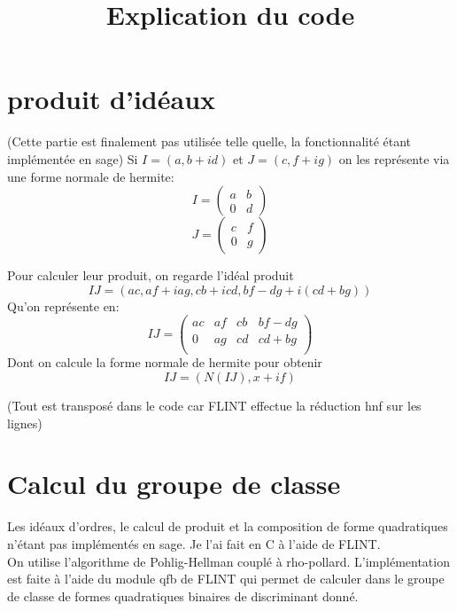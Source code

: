 \documentclass[12pt]{article}
\theoremstyle{plain}
\theoremstyle{definition}
\begin{document}
\title{Explication du code}
\section{produit d'idéaux}
\maketitle
(Cette partie est finalement pas utilisée telle quelle, la fonctionnalité étant implémentée en sage)
Si $I=(a, b+id)$ et $J=(c, f+ig)$ on les représente via une forme normale de hermite:
\[
    I=\begin{pmatrix}a & b\\ 0&d\end{pmatrix}
\]
\[
    J=\begin{pmatrix}c & f\\ 0&g\end{pmatrix}
\]

Pour calculer leur produit, on regarde l'idéal produit 
\[
    IJ=(ac, af+iag, cb+icd, bf-dg+i(cd+bg))
\]
Qu'on représente en:
\[
    IJ=\begin{pmatrix}ac & af & cb & bf-dg\\
        0 & ag & cd & cd+bg\\
    \end{pmatrix}
\]
Dont on calcule la forme normale de hermite pour obtenir 
\[IJ=(N(IJ), x+if)\]

(Tout est transposé dans le code car FLINT effectue la réduction 
hnf sur les lignes)

\section{Calcul du groupe de classe}
Les idéaux d'ordres, le calcul de produit et la composition de forme quadratiques n'étant pas implémentés 
en sage. Je l'ai fait en C à l'aide de FLINT.\\
On utilise l'algorithme de Pohlig-Hellman couplé à rho-pollard. L'implémentation 
est faite à l'aide du module qfb de FLINT qui permet de calculer dans le groupe de classe de 
formes quadratiques binaires de discriminant donné.
\end{document}
